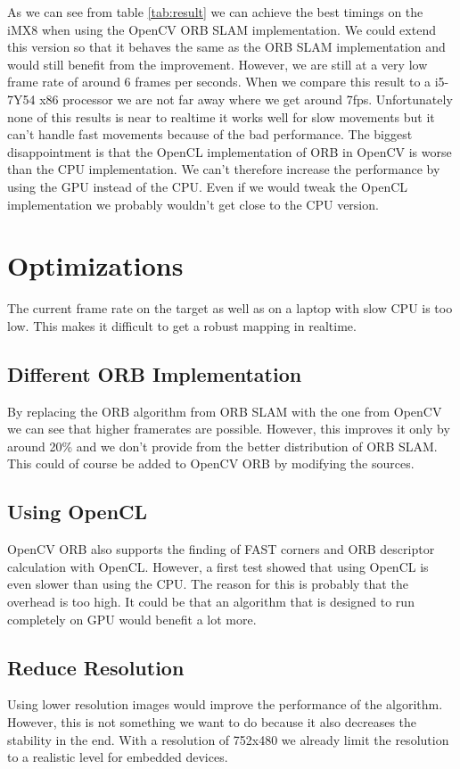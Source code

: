 \documentclass[11pt,a4paper,titlepage,oneside]{report}
\begin{document}
As we can see from table \ref{tab:result} we can achieve the best timings on the iMX8 when using the OpenCV ORB SLAM implementation. We could extend this version so that it behaves the same as the ORB SLAM implementation and would still benefit from the improvement. However, we are still at a very low frame rate of around 6 frames per seconds. When we compare this result to a i5-7Y54 x86 processor we are not far away where we get around 7fps. Unfortunately none of this results is near to realtime it works well for slow movements but it can't handle fast movements because of the bad performance. The biggest disappointment is that the OpenCL implementation of ORB in OpenCV is worse than the CPU implementation. We can't therefore increase the performance by using the GPU instead of the CPU. Even if we would tweak the OpenCL implementation we probably wouldn't get close to the CPU version.

\section{Optimizations}

The current frame rate on the target as well as on a laptop with slow CPU is too low. This makes it difficult to get a robust mapping in realtime.

\subsection{Different ORB Implementation}
By replacing the ORB algorithm from ORB SLAM with the one from OpenCV we can see that higher framerates are possible. However, this improves it only by around 20\% and we don't provide from the better distribution of ORB SLAM. This could of course be added to OpenCV ORB by modifying the sources.

\subsection{Using OpenCL}
OpenCV ORB also supports the finding of FAST corners and ORB descriptor calculation with OpenCL. However, a first test showed that using OpenCL is even slower than using the CPU. The reason for this is probably that the overhead is too high. It could be that an algorithm that is designed to run completely on GPU would benefit a lot more.

\subsection{Reduce Resolution}
Using lower resolution images would improve the performance of the algorithm. However, this is not something we want to do because it also decreases the stability in the end. With a resolution of 752x480 we already limit the resolution to a realistic level for embedded devices.
\end{document}
